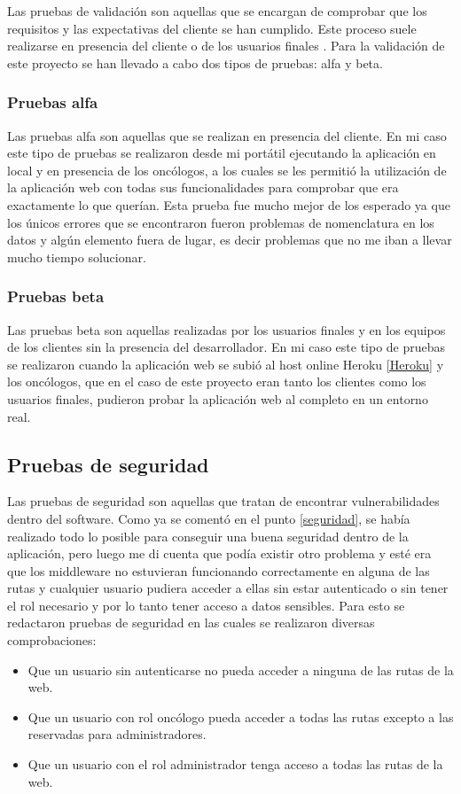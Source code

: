 Las pruebas de validación son aquellas que se encargan de comprobar que los requisitos y las expectativas del cliente se han cumplido. Este proceso suele realizarse en presencia del cliente o de los usuarios finales \cite{validacion}. Para la validación de este proyecto se han llevado a cabo dos tipos de pruebas: alfa y beta.

\subsubsection{Pruebas alfa}

Las pruebas alfa son aquellas que se realizan en presencia del cliente. En mi caso este tipo de pruebas se realizaron desde mi portátil ejecutando la aplicación en local y en presencia de los oncólogos, a los cuales se les permitió la utilización de la aplicación web con todas sus funcionalidades para comprobar que era exactamente lo que querían. Esta prueba fue mucho mejor de los esperado ya que los únicos errores que se encontraron fueron problemas de nomenclatura en los datos y algún elemento fuera de lugar, es decir problemas que no me iban a llevar mucho tiempo solucionar.

\subsubsection{Pruebas beta}

Las pruebas beta son aquellas realizadas por los usuarios finales y en los equipos de los clientes sin la presencia del desarrollador. En mi caso este tipo de pruebas se realizaron cuando la aplicación web se subió al host online Heroku \ref{Heroku} y los oncólogos, que en el caso de este proyecto eran tanto los clientes como los usuarios finales, pudieron probar la aplicación web al completo en un entorno real.

\subsection{Pruebas de seguridad}

Las pruebas de seguridad son aquellas que tratan de encontrar vulnerabilidades dentro del software. Como ya se comentó en el punto \ref{seguridad}, se había realizado todo lo posible para conseguir una buena seguridad dentro de la aplicación, pero luego me di cuenta que podía existir otro problema y esté era que los middleware no estuvieran funcionando correctamente en alguna de las rutas y cualquier usuario pudiera acceder a ellas sin estar autenticado o sin tener el rol necesario y por lo tanto tener acceso a datos sensibles. Para esto se redactaron pruebas de seguridad en las cuales se realizaron diversas comprobaciones:
\begin{itemize}
    \item Que un usuario sin autenticarse no pueda acceder a ninguna de las rutas de la web.
    \item Que un usuario con rol oncólogo pueda acceder a todas las rutas excepto a las reservadas para administradores.
    \item Que un usuario con el rol administrador tenga acceso a todas las rutas de la web.
\end{itemize}


